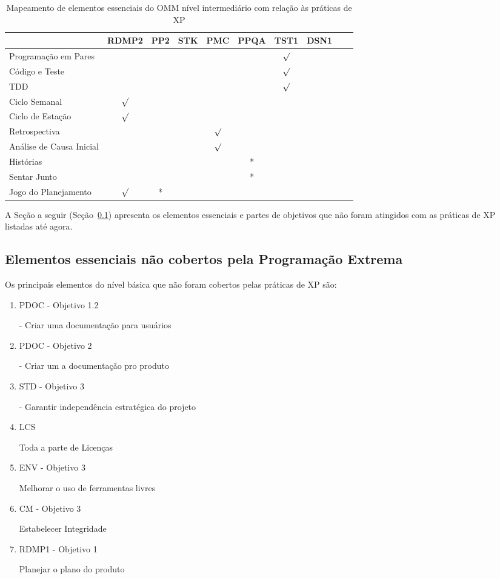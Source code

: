 \begin{table}
  \centering
  \begin{tabular}{|p{6cm}|c|c|c|c|c|c|c|c|c|}
    \hline
    & RDMP2 & PP2 & STK & PMC & PPQA & TST1 & DSN1\\
    \hline
    Programação em Pares & & & & & & $\surd$ & \\
    \hline
    Código e Teste & & & & & & $\surd$ & \\
    \hline
    TDD & & & & & & $\surd$ & \\
    \hline
    Ciclo Semanal & $\surd$ & & & & & & \\
    \hline
    Ciclo de Estação & $\surd$ & & & & & & \\
    \hline
    Retrospectiva & & & & $\surd$ & & & \\
    \hline
    Análise de Causa Inicial & & & & $\surd$ & & & \\
    \hline
    Histórias & & & & & * & & \\
    \hline
    Sentar Junto & & & & & * & & \\
    \hline
    Jogo do Planejamento & $\surd$ & * & & & & & \\
    \hline
  \end{tabular}
  \caption{Mapeamento de elementos essenciais do OMM nível
    intermediário com relação às práticas de XP}
  \label{tab:omm-intermediary-by-xp}
\end{table}

A Seção a seguir (Seção~\ref{sec:xp-omm}) apresenta os elementos
essenciais e partes de objetivos que não foram atingidos com as
práticas de XP listadas até agora.

\subsection{Elementos essenciais não cobertos pela Programação
  Extrema}
\label{sec:xp-omm}

Os principais elementos do nível básica que não foram cobertos pelas
práticas de XP são:

\begin{enumerate}
\item PDOC - Objetivo 1.2

  - Criar uma documentação para usuários
  \label{omm:pdoc1.2}
\item PDOC - Objetivo 2

  - Criar um a documentação pro produto
  \label{omm:pdoc2}
\item STD - Objetivo 3

  - Garantir independência estratégica do projeto
  \label{omm:std3}
\item LCS

  Toda a parte de Licenças
  \label{omm:lcs}
\item ENV - Objetivo 3

  Melhorar o uso de ferramentas livres
  \label{omm:env3}
\item CM - Objetivo 3

  Estabelecer Integridade
  \label{omm:cm3}
\item RDMP1 - Objetivo 1

  Planejar o plano do produto
  \label{omm:rdmp11}
\end{enumerate}

